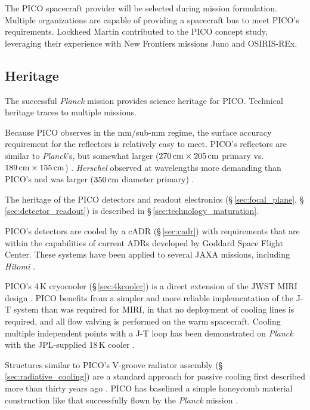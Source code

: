 The PICO spacecraft provider will be selected during mission
formulation. Multiple organizations are capable of providing a
spacecraft bus to meet PICO's requirements. Lockheed Martin
contributed to the PICO concept study, leveraging their experience
with New Frontiers missions Juno and OSIRIS-REx.
 
\subsection{Heritage}
\label{sec:heritage} %

The successful \textit{Planck} mission provides science heritage for
PICO. Technical heritage traces to multiple missions.

Because PICO observes in the mm/sub-mm regime, the surface accuracy
requirement for the reflectors is relatively easy to meet. PICO's
reflectors are similar to \textit{Planck}'s, but somewhat larger
($270\,{\rm cm} \times 205\,{\rm cm}$ primary vs.\
$189\,{\rm cm} \times 155\,{\rm cm}$)
\citep{Gloesener2006}. \textit{Herschel} observed at wavelengths more
demanding than PICO's and was larger ($350\,{\rm cm}$ diameter
primary) \citep{Toulemont2004}.

The heritage of the PICO detectors and readout electronics
(\S\,\ref{sec:focal_plane}, \S\,\ref{sec:detector_readout}) is
described in \S\,\ref{sec:technology_maturation}.


PICO's detectors are cooled by a cADR (\S\,\ref{sec:cadr}) with
requirements that are within the capabilities of current ADRs
developed by Goddard Space Flight Center. These systems have been
applied to several JAXA missions, including \textit{Hitomi} \citep{Shirron2016}.

PICO's 4\,K cryocooler (\S\,\ref{sec:4kcooler}) is a direct extension
of the JWST MIRI design \citep{Durand2008,Rabb2013}. PICO benefits
from a simpler and more reliable implementation of the J-T system than
was required for MIRI, in that no deployment of cooling lines is
required, and all flow valving is performed on the warm
spacecraft. Cooling multiple independent points with a J-T loop has
been demonstrated on \textit{Planck} with the JPL-supplied 18\,K
cooler \citep{Planck2011}.

Structures similar to PICO's V-groove radiator assembly
(\S\,\ref{sec:radiative_cooling}) are a standard approach for passive
cooling first described more than thirty years ago
\citep{Bard1987}. 
PICO
has baselined a simple honeycomb material construction like that
successfully flown by the \textit{Planck} mission
\citep{ESA2009,Planck2011}.

